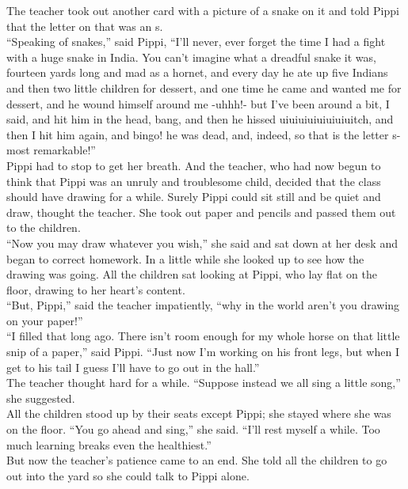 \documentclass{standard}
\begin{document}
The teacher took out another card with a picture of a snake on it and told Pippi that the letter on that was an s.\\

“Speaking of snakes,” said Pippi, “I’ll never, ever forget the time I had a fight with a huge snake in India. You can’t imagine what a dreadful snake it was, fourteen yards long and mad as a hornet, and every day he ate up five Indians and then two little children for dessert, and one time he came and wanted me for dessert, and he wound himself around me -uhhh!- but I’ve been around a bit, I said, and hit him in the head, bang, and then he hissed uiuiuiuiuiuiuiuitch, and then I hit him again, and bingo! he was dead, and, indeed, so that is the letter s- most remarkable!”\\

Pippi had to stop to get her breath. And the teacher, who had now begun to think that Pippi was an unruly and troublesome child, decided that the class should have drawing for a while. Surely Pippi could sit still and be quiet and draw, thought the teacher. She took out paper and pencils and passed them out to the children.\\

“Now you may draw whatever you wish,” she said and sat down at her desk and began to correct homework. In a little while she looked up to see how the drawing was going. All the children sat looking at Pippi, who lay flat on the floor, drawing to her heart’s content.\\

“But, Pippi,” said the teacher impatiently, “why in the world aren’t you drawing on your paper!”\\

“I filled that long ago. There isn’t room enough for my whole horse on that little snip of a paper,” said Pippi. “Just now I’m working on his front legs, but when I get to his tail I guess I’ll have to go out in the hall.”\\

The teacher thought hard for a while. “Suppose instead we all sing a little song,” she suggested.\\

All the children stood up by their seats except Pippi; she stayed where she was on the floor. “You go ahead and sing,” she said. “I’ll rest myself a while. Too much learning breaks even the healthiest.”\\

But now the teacher’s patience came to an end. She told all the children to go out into the yard so she could talk to Pippi alone.\\
\end{document}
